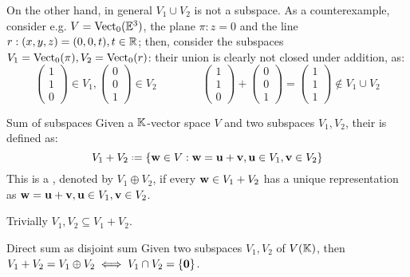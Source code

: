 On the other hand, in general $ V_1 \cup V_2 $ is not a subspace. As a counterexample, consider e.g. $ V = \mathrm{Vect}_0(\mathbb{E}^3) $, the plane $ \pi : z = 0 $ and the line $ r : (x,y,z) = (0,0,t) , t \in \mathbb{R} $; then, consider the subspaces $ V_1 = \mathrm{Vect}_0(\pi) , V_2 = \mathrm{Vect}_0(r) $: their union is clearly not closed under addition, as:
\begin{equation*}
  \begin{pmatrix}
    1 \\ 1 \\ 0
  \end{pmatrix} \in V_1
  ,
  \begin{pmatrix}
    0 \\ 0 \\ 1
  \end{pmatrix} \in V_2
  \qquad \qquad
  \begin{pmatrix}
    1 \\ 1 \\ 0
  \end{pmatrix}
  +
  \begin{pmatrix}
    0 \\ 0 \\ 1
  \end{pmatrix}
  =
  \begin{pmatrix}
    1 \\ 1 \\ 1
  \end{pmatrix} \notin V_1 \cup V_2
\end{equation*}

\begin{definition}{Sum of subspaces}{}
  Given a $ \mathbb{K} $-vector space $ V $ and two subspaces $ V_1 , V_2 $, their  is defined as:
  \begin{equation*}
    V_1 + V_2 \defeq \{\ve{w} \in V : \ve{w} = \ve{u} + \ve{v}, \ve{u} \in V_1, \ve{v} \in V_2\}
  \end{equation*}
  This is a , denoted by $ V_1 \oplus V_2 $, if every $ \mathbf{w} \in V_1 + V_2 $ has a unique representation as $ \mathbf{w} = \mathbf{u} + \mathbf{v} , \mathbf{u} \in V_1 , \mathbf{v} \in V_2 $.
\end{definition}

Trivially $ V_1 , V_2 \subseteq V_1 + V_2 $.

\begin{lemma}{Direct sum as disjoint sum}{}
  Given two subspaces $ V_1 , V_2 $ of $ V(\mathbb{K}) $, then $ V_1 + V_2 = V_1 \oplus V_2 \iff V_1 \cap V_2 = \{\mathbf{0}\} $.
\end{lemma}

